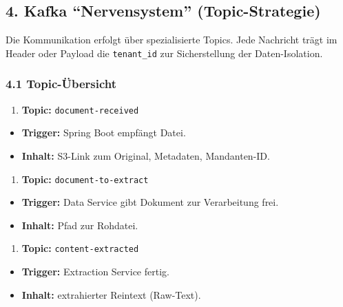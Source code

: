 \subsection{4. Kafka ``Nervensystem''
(Topic-Strategie)}\label{kafka-nervensystem-topic-strategie}

Die Kommunikation erfolgt über spezialisierte Topics. Jede Nachricht
trägt im Header oder Payload die \texttt{tenant\_id} zur Sicherstellung
der Daten-Isolation.

\subsubsection{4.1 Topic-Übersicht}\label{topic-uxfcbersicht}

\begin{enumerate}
\def\labelenumi{\arabic{enumi}.}
\tightlist
\item
  \textbf{Topic:} \texttt{document-received}
\end{enumerate}

\begin{itemize}
\tightlist
\item
  \textbf{Trigger:} Spring Boot empfängt Datei.
\item
  \textbf{Inhalt:} S3-Link zum Original, Metadaten, Mandanten-ID.
\end{itemize}

\begin{enumerate}
\def\labelenumi{\arabic{enumi}.}
\setcounter{enumi}{1}
\tightlist
\item
  \textbf{Topic:} \texttt{document-to-extract}
\end{enumerate}

\begin{itemize}
\tightlist
\item
  \textbf{Trigger:} Data Service gibt Dokument zur Verarbeitung frei.
\item
  \textbf{Inhalt:} Pfad zur Rohdatei.
\end{itemize}

\begin{enumerate}
\def\labelenumi{\arabic{enumi}.}
\setcounter{enumi}{2}
\tightlist
\item
  \textbf{Topic:} \texttt{content-extracted}
\end{enumerate}

\begin{itemize}
\tightlist
\item
  \textbf{Trigger:} Extraction Service fertig.
\item
  \textbf{Inhalt:} extrahierter Reintext (Raw-Text).
\end{itemize}

